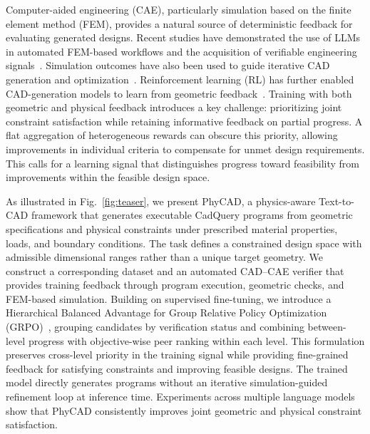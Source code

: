 Computer-aided engineering (CAE), particularly simulation based on the finite element method (FEM), provides a natural source of deterministic feedback for evaluating generated designs. Recent studies have demonstrated the use of LLMs in automated FEM-based workflows and the acquisition of verifiable engineering signals~\citep{hou2025autofea,qi2025feagpt}. Simulation outcomes have also been used to guide iterative CAD generation and optimization~\citep{berger2026physics,son2026self,deng2026cosmo}. Reinforcement learning (RL) has further enabled CAD-generation models to learn from geometric feedback~\citep{guan2026cad}. Training with both geometric and physical feedback introduces a key challenge: prioritizing joint constraint satisfaction while retaining informative feedback on partial progress. A flat aggregation of heterogeneous rewards can obscure this priority, allowing improvements in individual criteria to compensate for unmet design requirements. This calls for a learning signal that distinguishes progress toward feasibility from improvements within the feasible design space.

As illustrated in Fig.~\ref{fig:teaser}, we present PhyCAD, a physics-aware Text-to-CAD framework that generates executable CadQuery programs from geometric specifications and physical constraints under prescribed material properties, loads, and boundary conditions. The task defines a constrained design space with admissible dimensional ranges rather than a unique target geometry. We construct a corresponding dataset and an automated CAD--CAE verifier that provides training feedback through program execution, geometric checks, and FEM-based simulation. Building on supervised fine-tuning, we introduce a Hierarchical Balanced Advantage for Group Relative Policy Optimization (GRPO)~\citep{shao2024deepseekmath}, grouping candidates by verification status and combining between-level progress with objective-wise peer ranking within each level. This formulation preserves cross-level priority in the training signal while providing fine-grained feedback for satisfying constraints and improving feasible designs. The trained model directly generates programs without an iterative simulation-guided refinement loop at inference time. Experiments across multiple language models show that PhyCAD consistently improves joint geometric and physical constraint satisfaction.


